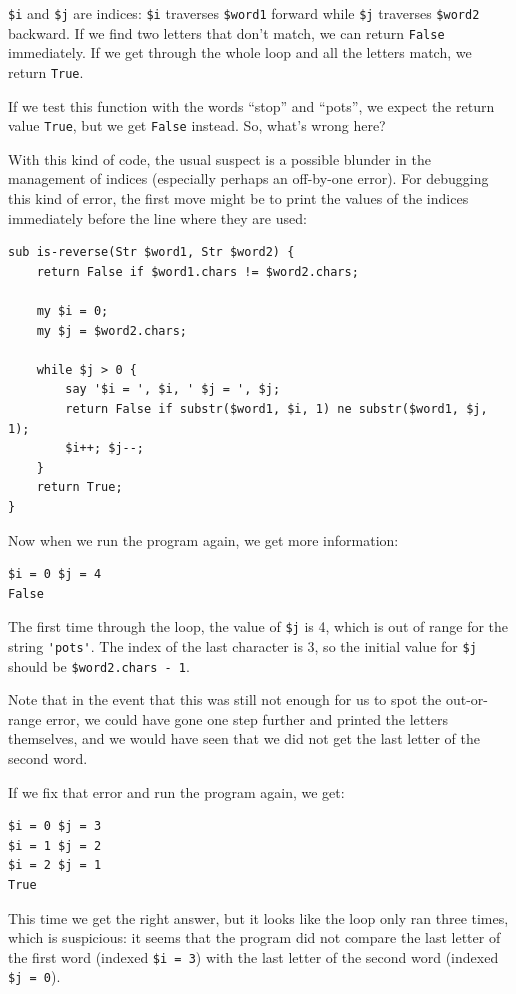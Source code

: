 {\tt \$i} and {\tt \$j} are indices: {\tt \$i} traverses 
{\tt \$word1} forward while {\tt \$j} traverses {\tt \$word2} 
backward.  If we find two letters that don't match, we 
can return {\tt False} immediately. If we get through the 
whole loop and all the letters match, we return {\tt True}.

If we test this function with the words ``stop'' and 
``pots'', we expect the return value {\tt True}, but we get 
{\tt False} instead. So, what's wrong here?

With this kind of code, the usual suspect is a possible 
blunder in the management of indices (especially perhaps 
an off-by-one error). For debugging this kind of error, 
the first move might be to print the values of the indices 
immediately before the line where they are used:

\begin{verbatim}
sub is-reverse(Str $word1, Str $word2) {
    return False if $word1.chars != $word2.chars;
    
    my $i = 0;
    my $j = $word2.chars;

    while $j > 0 {
        say '$i = ', $i, ' $j = ', $j;
        return False if substr($word1, $i, 1) ne substr($word1, $j, 1);
        $i++; $j--;
    }
    return True;
}
\end{verbatim}
%
Now when we run the program again, we get more information:

\begin{verbatim}
$i = 0 $j = 4
False
\end{verbatim}
%
The first time through the loop, the value of {\tt \$j} is 4,
which is out of range for the string \verb"'pots'".
The index of the last character is 3, so the
initial value for {\tt \$j} should be {\tt \$word2.chars - 1}.

Note that in the event that this was still not enough for us to 
spot the out-or-range error, we could have gone one step 
further and printed the letters themselves, and we would 
have seen that we did not get the last letter of the second 
word.

If we fix that error and run the program again, we get:

\begin{verbatim}
$i = 0 $j = 3
$i = 1 $j = 2
$i = 2 $j = 1
True
\end{verbatim}
%
This time we get the right answer, but it looks like the 
loop only ran three times, which is suspicious: it seems 
that the program did not compare the last letter of the 
first word (indexed {\tt \$i = 3}) with the last letter of 
the second word (indexed {\tt \$j = 0}).  

